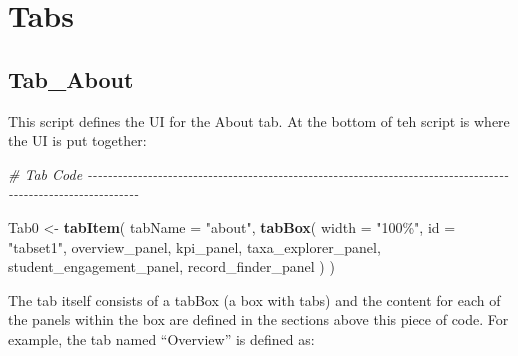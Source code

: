\documentclass[
]{book}
\newenvironment{Shaded}{\begin{snugshade}}{\end{snugshade}}
\newcommand{\AttributeTok}[1]{\textcolor[rgb]{0.13,0.29,0.53}{#1}}
\newcommand{\CommentTok}[1]{\textcolor[rgb]{0.56,0.35,0.01}{\textit{#1}}}
\newcommand{\FunctionTok}[1]{\textcolor[rgb]{0.13,0.29,0.53}{\textbf{#1}}}
\newcommand{\NormalTok}[1]{#1}
\newcommand{\OtherTok}[1]{\textcolor[rgb]{0.56,0.35,0.01}{#1}}
\newcommand{\StringTok}[1]{\textcolor[rgb]{0.31,0.60,0.02}{#1}}
\begin{document}
\hypertarget{tabs}{%
\section{Tabs}\label{tabs}}

\hypertarget{tab_about}{%
\subsection{Tab\_About}\label{tab_about}}

This script defines the UI for the About tab. At the bottom of teh script is where the UI is put together:

\begin{Shaded}
\begin{Highlighting}[]
\CommentTok{\# Tab Code {-}{-}{-}{-}{-}{-}{-}{-}{-}{-}{-}{-}{-}{-}{-}{-}{-}{-}{-}{-}{-}{-}{-}{-}{-}{-}{-}{-}{-}{-}{-}{-}{-}{-}{-}{-}{-}{-}{-}{-}{-}{-}{-}{-}{-}{-}{-}{-}{-}{-}{-}{-}{-}{-}{-}{-}{-}{-}{-}{-}{-}{-}{-}{-}{-}{-}{-}{-}{-}{-}{-}{-}{-}{-}{-}{-}{-}{-}{-}{-}{-}{-}{-}{-}{-}{-}{-}{-}{-}{-}{-}{-}{-}{-}{-}{-}{-}{-}{-}{-}{-}{-}{-}{-}{-}{-}{-}{-}{-}{-}}

\NormalTok{Tab0 }\OtherTok{\textless{}{-}} \FunctionTok{tabItem}\NormalTok{(}
  \AttributeTok{tabName =} \StringTok{"about"}\NormalTok{,}
  \FunctionTok{tabBox}\NormalTok{(}
    \AttributeTok{width =} \StringTok{"100\%"}\NormalTok{,}
    \AttributeTok{id =} \StringTok{"tabset1"}\NormalTok{,}
\NormalTok{    overview\_panel,}
\NormalTok{    kpi\_panel,}
\NormalTok{    taxa\_explorer\_panel,}
\NormalTok{    student\_engagement\_panel,}
\NormalTok{    record\_finder\_panel}
\NormalTok{  )}
\NormalTok{)}
\end{Highlighting}
\end{Shaded}

The tab itself consists of a tabBox (a box with tabs) and the content for each of the panels within the box are defined in the sections above this piece of code. For example, the tab named ``Overview'' is defined as:
\end{document}
